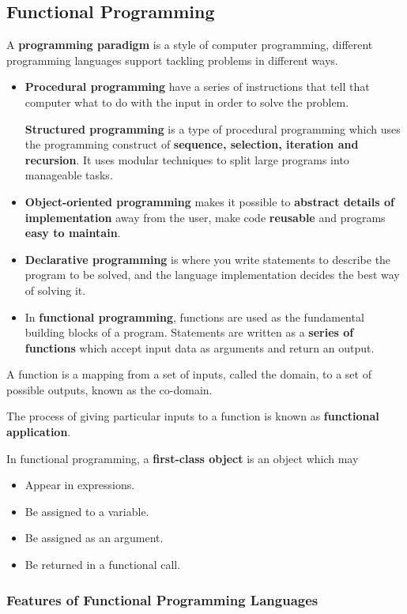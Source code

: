 \subsection{Functional Programming}

A \textbf{programming paradigm} is a style of computer programming, different programming languages support tackling problems in different ways.
\begin{itemize}
    \item \textbf{Procedural programming} have a series of instructions that tell that computer what to do with the input in order to solve the problem.

        \textbf{Structured programming} is a type of procedural programming which uses the programming construct of \textbf{sequence, selection, iteration and recursion}. It uses modular techniques to split large programs into manageable tasks.
    \item \textbf{Object-oriented programming} makes it possible to \textbf{abstract details of implementation} away from the user, make code \textbf{reusable} and programs \textbf{easy to maintain}.
    \item \textbf{Declarative programming} is where you write statements to describe the program to be solved, and the language implementation decides the best way of solving it.
    \item In \textbf{functional programming}, functions are used as the fundamental building blocks of a program. Statements are written as a \textbf{series of functions} which accept input data as arguments and return an output.
\end{itemize}

A function is a mapping from a set of inputs, called the domain, to a set of possible outputs, known as the co-domain.

The process of giving particular inputs to a function is known as \textbf{functional application}.

In functional programming, a \textbf{first-class object} is an object which may
\begin{itemize}
    \item Appear in expressions.
    \item Be assigned to a variable.
    \item Be assigned as an argument.
    \item Be returned in a functional call.
\end{itemize}

\subsubsection*{Features of Functional Programming Languages}

